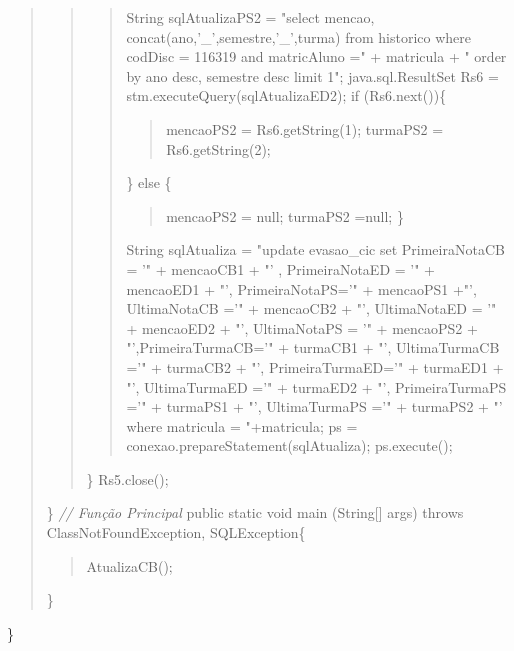\begin{quote}
\begin{quote}
\begin{quote}
		String sqlAtualizaPS2 = "select mencao, concat(ano,'\_',semestre,'\_',turma) from historico where codDisc = 116319 and matricAluno ="
		 + matricula + " order by ano desc, semestre desc limit 1"; \newline
		java.sql.ResultSet Rs6 = stm.executeQuery(sqlAtualizaED2); \newline
		if (Rs6.next())\{
		\begin{quote}
			mencaoPS2 = Rs6.getString(1); \newline
			turmaPS2 = Rs6.getString(2);
		\end{quote}
		\} else \{
		\begin{quote}
		mencaoPS2 = null; \newline
		turmaPS2 =null; \newline
		\}
		\end{quote}
	String sqlAtualiza = "update evasao\_cic set PrimeiraNotaCB = '" + mencaoCB1 + "' , PrimeiraNotaED = '" + mencaoED1 + 
	"', PrimeiraNotaPS='" + mencaoPS1 +"', UltimaNotaCB ='" + mencaoCB2 + "', UltimaNotaED = '" + mencaoED2 + "', UltimaNotaPS = '" + mencaoPS2 + "',PrimeiraTurmaCB='" + turmaCB1 + 
	"', UltimaTurmaCB ='" + turmaCB2 + "', PrimeiraTurmaED='" + turmaED1 + "', UltimaTurmaED ='" + turmaED2 + "', PrimeiraTurmaPS ='" + 
	turmaPS1 + "', UltimaTurmaPS ='" + turmaPS2 +
	"' where matricula = "+matricula; \newline
	ps = conexao.prepareStatement(sqlAtualiza); \newline
	ps.execute(); 
	\end{quote}
	\} \newline
	Rs5.close();
\end{quote}
	\} \newline
	\newline
\textit{// Função Principal} \newline
 public static void main (String[] args) throws ClassNotFoundException, SQLException\{ 
 \begin{quote}
 	AtualizaCB(); 
 	\end{quote}
 \}
\end{quote}
\}